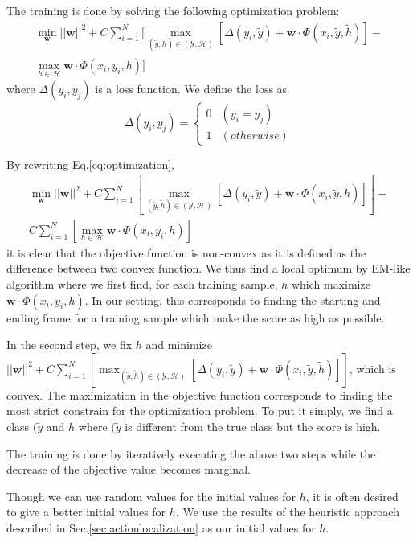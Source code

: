 \documentclass[10pt,twocolumn,letterpaper]{article}
\begin{document}
The training is done by solving the following optimization problem:
\begin{equation}\label{eq:optimization}
\begin{aligned}
\min_{\mathbf{w}} ||\mathbf{w} ||^2 + C \sum_{i=1}^{N} [ \max_{ (\tilde{y},\tilde{h}) \in (\mathcal{Y},\mathcal{H}) } [ \Delta(y_i, \tilde{y}) + \mathbf{w} \cdot \Phi(x_i, \tilde{y}, \tilde{h} )] - \\
\max_{h \in \mathcal{H}}  \mathbf{w} \cdot \Phi(x_i,y_i, h)]
\end{aligned}
\end{equation}
where $\Delta(y_i,y_j)$  is a loss function. We define the loss as
\[
  \Delta(y_i,y_j) = \begin{cases}
    0 & (y_i = y_j ) \\
    1 & (otherwise)
  \end{cases}
\]

By rewriting Eq.\ref{eq:optimization},
\begin{align*}\label{eq:optimization}
\min_{\mathbf{w}} ||\mathbf{w} ||^2 + C \sum_{i=1}^{N} [ \max_{ (\tilde{y},\tilde{h}) \in (\mathcal{Y},\mathcal{H}) } [ \Delta(y_i, \tilde{y}) + \mathbf{w} \cdot \Phi(x_i, \tilde{y}, \tilde{h} )]] - \\
C \sum_{i=1}^{N} [ \max_{h \in \mathcal{H}}  \mathbf{w} \cdot \Phi(x_i,y_i, h)]
\end{align*}
it is clear that the objective function is non-convex as it is defined as the difference between two convex function. We thus find a local optimum by EM-like algorithm where we first find, for each training sample, $h$ which maximize $\mathbf{w} \cdot \Phi(x_i,y_i, h)$. In our setting, this corresponds to finding the starting and ending frame for a training sample which make the score as high as possible.

In the second step, we fix $h$ and minimize $||\mathbf{w} ||^2 + C \sum_{i=1}^{N} [ \max_{ (\tilde{y},\tilde{h}) \in (\mathcal{Y},\mathcal{H}) } [ \Delta(y_i, \tilde{y}) + \mathbf{w} \cdot \Phi(x_i, \tilde{y}, \tilde{h} )]]$, which is convex. The maximization in the objective function corresponds to finding the most strict constrain for the optimization problem. To put it simply, we find a class $(\tilde{y}$ and $h$ where $(\tilde{y}$ is different from the true class but the score is high. 

The training is done by iteratively executing the above two steps while the decrease of the objective value becomes marginal.

Though we can use random values for the initial values for $h$, it is often desired to give a better initial values for $h$. We use the results of the heuristic approach described in Sec.\ref{sec:actionlocalization} as our initial values for $h$.
\end{document}
